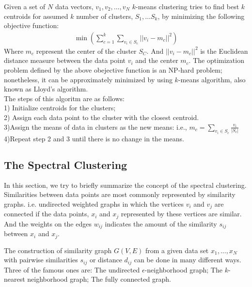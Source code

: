 \documentclass[onecolumn,notitlepage]{revtex4-1}
\begin{document}
Given a set of $N$ data vectors, $v_{1},v_{2},\dots,v_{N}$ $k$-means clustering tries to find best $k$ centroids for assumed $k$ number of clusters, $S_{1},…S_{k}$, by minimizing the following objective function:
\begin{align}
    \min(\sum_{c=1}^{k}\sum_{v_{i}\in S_{c}}||v_i-m_c||^2)
\end{align}
Where $m_{c}$ represent the center of the cluster $S_C$. And $||v_i-m_c||^2$ is the Euclidean distance measure between the data point $v_i$ and the center $m_c$. The optimization problem defined by the above obejective function is an NP-hard problem; nonetheless, it can be approximately minimized by using $k$-means algorithm, also known as Lloyd’s algorithm.\\ The steps of this algoritm are as follows:\\
1) Initialize centroids for the clusters;\\
2) Assign each data point to the cluster with the closest centroid.\\
3)Assign the means of data in clusters as the new means: i.e., $m_c=\sum_{v_{i}\in S_c}\frac{v_i}{|S_c|}$\\
4)Repeat step 2 and 3 until there is no change in the means.\\

\subsection{The Spectral Clustering}

In this section, we try to briefly summarize the concept of the spectral clustering. Similarities between data points are most commonly represented by similarity graphs. i.e. undirected weighted graphs in which the vertices $v_i$ and $v_j$ are connected if the data points, $x_i$ and $x_j$ represented by these vertices are similar. And the weights on the edges $w_{ij}$ indicates the amount of the similarity $s_{ij}$ between $x_i$ and $x_j$.

The construction of similarity graph $G(V,E)$ from a given data set ${x_{1},...,x_{N}}$ with pairwise similarities $s_{ij}$ or distance $d_{ij}$ can be done in many different ways. Three of the famous ones are: The undirected $\epsilon$-neighborhood graph; The $k$-nearest neighborhood graph; The fully connected graph.
\end{document}
